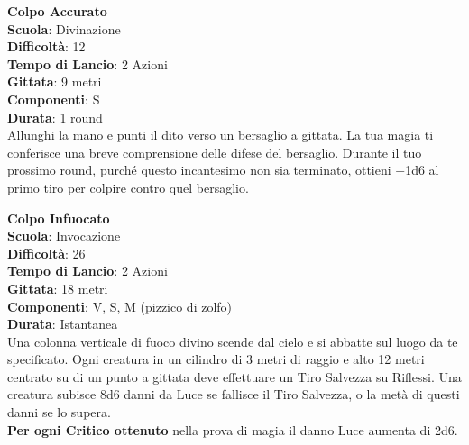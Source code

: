 \begin{multicols}{2}
\medskip\textbf{Colpo Accurato}\\
\textbf{Scuola}: Divinazione\\
\textbf{Difficoltà}: 12\\
\textbf{Tempo di Lancio}: 2 Azioni\\
\textbf{Gittata}: 9 metri\\
\textbf{Componenti}: S\\
\textbf{Durata}: 1 round\\
Allunghi la mano e punti il dito verso un bersaglio a gittata. La tua magia ti conferisce una breve comprensione delle difese del bersaglio. Durante il tuo prossimo round, purché questo incantesimo non sia terminato, ottieni +1d6 al primo tiro per colpire contro quel bersaglio.

\medskip\textbf{Colpo Infuocato}\\
\textbf{Scuola}: Invocazione\\
\textbf{Difficoltà}: 26\\
\textbf{Tempo di Lancio}: 2 Azioni\\
\textbf{Gittata}: 18 metri\\
\textbf{Componenti}: V, S, M (pizzico di zolfo)\\
\textbf{Durata}: Istantanea\\
Una colonna verticale di fuoco divino scende dal cielo e si abbatte sul luogo da te specificato. Ogni creatura in un cilindro di 3 metri di raggio e alto 12 metri centrato su di un punto a gittata deve effettuare un Tiro Salvezza su Riflessi. Una creatura subisce 8d6 danni da Luce se fallisce il Tiro Salvezza, o la metà di questi danni se lo supera.\\
\textbf{Per ogni Critico ottenuto} nella prova di magia il danno Luce aumenta di 2d6.


\end{multicols}
